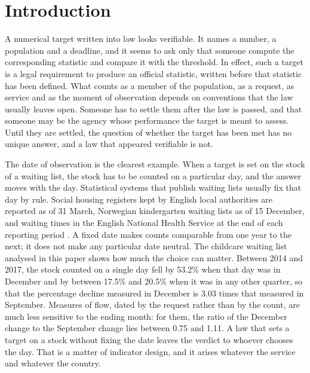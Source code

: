 \section{Introduction}\label{sec:intro}

A numerical target written into law looks verifiable. It names a number, a population and a deadline, and it seems to ask only that someone compute the corresponding statistic and compare it with the threshold. In effect, such a target is a legal requirement to produce an official statistic, written before that statistic has been defined. What counts as a member of the population, as a request, as service and as the moment of observation depends on conventions that the law usually leaves open. Someone has to settle them after the law is passed, and that someone may be the agency whose performance the target is meant to assess. Until they are settled, the question of whether the target has been met has no unique answer, and a law that appeared verifiable is not.

The date of observation is the clearest example. When a target is set on the stock of a waiting list, the stock has to be counted on a particular day, and the answer moves with the day. Statistical systems that publish waiting lists usually fix that day by rule. Social housing registers kept by English local authorities are reported as of 31 March, Norwegian kindergarten waiting lists as of 15 December, and waiting times in the English National Health Service at the end of each reporting period \citep{mhclg_table600,ssb13632,nhs_rtt_mar26}. A fixed date makes counts comparable from one year to the next; it does not make any particular date neutral. The childcare waiting list analysed in this paper shows how much the choice can matter. Between 2014 and 2017, the stock counted on a single day fell by 53.2\% when that day was in December and by between 17.5\% and 20.5\% when it was in any other quarter, so that the percentage decline measured in December is 3.03 times that measured in September. Measures of flow, dated by the request rather than by the count, are much less sensitive to the ending month: for them, the ratio of the December change to the September change lies between 0.75 and 1.11. A law that sets a target on a stock without fixing the date leaves the verdict to whoever chooses the day. That is a matter of indicator design, and it arises whatever the service and whatever the country.


